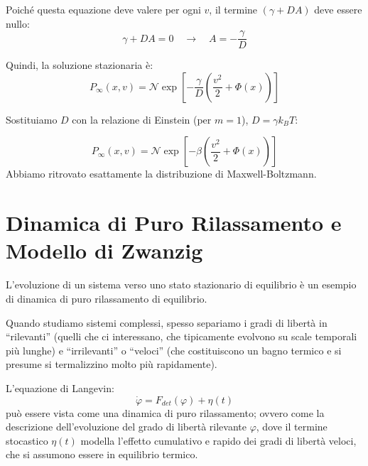 Poiché questa equazione deve valere per ogni $v$, il termine $(\gamma+DA)$ deve essere nullo:
\begin{equation}
\gamma + DA = 0 \quad \longrightarrow \quad A = -\frac{\gamma}{D}
\end{equation}

Quindi, la soluzione stazionaria è:
\begin{equation}
P_{\infty}(x,v) = \mathcal{N} \exp\left[-\frac{\gamma}{D}\left(\frac{v^2}{2} + \Phi(x)\right)\right]
\end{equation}

Sostituiamo $D$ con la relazione di Einstein (per $m=1$), $D = \gamma k_B T$:
\begin{tcolorbox}[
    colback=colorA!5,      
    colframe=colorA,       
    arc=3mm,               
    boxrule=1.2pt
]
\begin{equation}
P_{\infty}(x,v) = \mathcal{N} \exp\left[- \beta\left(\frac{v^2}{2} + \Phi(x)\right)\right]
\end{equation}
Abbiamo ritrovato esattamente la distribuzione di Maxwell-Boltzmann.
\end{tcolorbox}

\section{Dinamica di Puro Rilassamento e Modello di Zwanzig}
L'evoluzione di un sistema verso uno stato stazionario di equilibrio è un esempio di dinamica di puro rilassamento di equilibrio.

\begin{tcolorbox}[
    colback=colorD!5,      
    colframe=colorD,       
    title={Attenzione},
    fonttitle=\bfseries\sffamily,
    arc=3mm,               
    boxrule=1.2pt,         
    halign title=flush left
]
Quando studiamo sistemi complessi, spesso separiamo i gradi di libertà in ``rilevanti'' (quelli che ci interessano, che tipicamente evolvono su scale temporali più lunghe) e ``irrilevanti'' o ``veloci'' (che costituiscono un bagno termico e si presume si termalizzino molto più rapidamente).
\end{tcolorbox}

L'equazione di Langevin:
\begin{equation*}
\dot{\varphi} = F_{det}(\varphi) + \eta(t)
\end{equation*}
può essere vista come una dinamica di puro rilassamento; ovvero come la descrizione dell'evoluzione del grado di libertà rilevante $\varphi$, dove il termine stocastico $\eta(t)$ modella l'effetto cumulativo e rapido dei gradi di libertà veloci, che si assumono essere in equilibrio termico.

